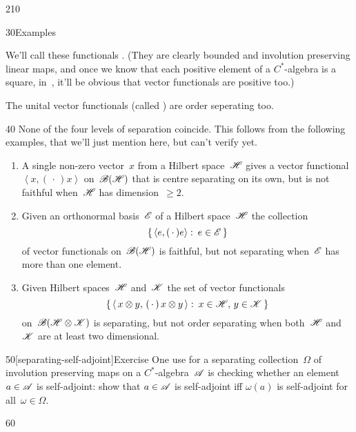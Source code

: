 \begin{parsec}{210}
\begin{point}{30}{Examples}
\begin{enumerate}
We'll call these functionals
%
%
.
(They are clearly bounded
and involution preserving linear maps,
and once we know that each positive element of a $C^*$-algebra
is a square, in~,
it'll be obvious that vector functionals
are positive too.)

The unital vector functionals (called )%
are order seperating too.
\end{enumerate}
\begin{point}{40}
None of the four levels of separation
coincide.
This follows from the following examples,
that we'll just mention here,
but can't verify yet.
\begin{enumerate}
\item
A single non-zero vector~$x$ from a Hilbert space~$\mathscr{H}$
gives a vector functional $\left<x,(\,\cdot\,)x\right>$
on~$\mathscr{B}(\mathscr{H})$ that is centre separating
on its own, but is not faithful when~$\mathscr{H}$ has dimension~$\geq 2$.
\item
Given an orthonormal basis~$\mathscr{E}$
of a Hilbert space~$\mathscr{H}$
		the collection 
\begin{equation*}
	\{\,\left<e,(\,\cdot\,)e\right>\colon\,e\in\mathscr{E}\,\}
\end{equation*}
		of vector functionals on~$\mathscr{B}(\mathscr{H})$
		is faithful, but not separating when~$\mathscr{E}$
		has more than one element.
\item
Given Hilbert spaces~$\mathscr{H}$
and~$\mathscr{K}$
the set of vector functionals
\begin{equation*}
	\{\,\left<\,x\otimes y,\,(\,\cdot\,)\,x\otimes y\,\right>\colon\,
x\in\mathscr{H},\,y\in\mathscr{K}\,\}
\end{equation*}
on~$\mathscr{B}(\mathscr{H}\otimes\mathscr{K})$
is separating,
but not order separating
when both~$\mathscr{H}$ and~$\mathscr{K}$
are at least two dimensional.
\end{enumerate}
\end{point}
\end{point}
\begin{point}{50}[separating-self-adjoint]{Exercise}%
One use for 
a separating collection~$\Omega$
of involution preserving maps
on a $C^*$-algebra~$\mathscr{A}$
is checking whether an element~$a\in\mathscr{A}$
is self-adjoint:
show that $a\in\mathscr{A}$ is self-adjoint
iff $\omega(a)$ is self-adjoint for all~$\omega\in\Omega$.
\end{point}
\begin{point}{60}%

\end{point}
\end{parsec}
